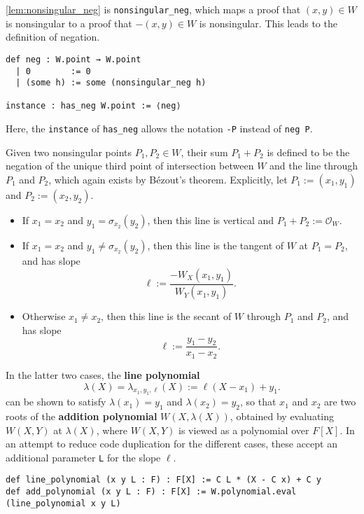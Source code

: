 \documentclass[a4paper,UKenglish,cleveref,autoref,thm-restate]{lipics-v2021}
\begin{document}
\pagebreak

\cref{lem:nonsingular_neg} is \texttt{nonsingular\_neg}, which maps a proof that $ (x, y) \in W $ is nonsingular to a proof that $ -(x, y) \in W $ is nonsingular. This leads to the definition of negation.
\begin{lstlisting}
def neg : W.point → W.point
  | 0        := 0
  | (some h) := some (nonsingular_neg h)

instance : has_neg W.point := ⟨neg⟩
\end{lstlisting}
Here, the \texttt{instance} of \texttt{has\_neg} allows the notation \texttt{-P} instead of \texttt{neg P}.

Given two nonsingular points $ P_1, P_2 \in W $, their sum $ P_1 + P_2 $ is defined to be the negation of the unique third point of intersection between $ W $ and the line through $ P_1 $ and $ P_2 $, which again exists by B\'ezout's theorem. Explicitly, let $ P_1 := (x_1, y_1) $ and $ P_2 := (x_2, y_2) $.
\begin{itemize}
\item If $ x_1 = x_2 $ and $ y_1 = \sigma_{x_2}(y_2) $, then this line is vertical and $ P_1 + P_2 := \mathcal{O}_W $.
\item If $ x_1 = x_2 $ and $ y_1 \ne \sigma_{x_2}(y_2) $, then this line is the tangent of $ W $ at $ P_1 = P_2 $, and has slope
\[ \ell := \dfrac{-W_X(x_1, y_1)}{W_Y(x_1, y_1)}. \]
\item Otherwise $ x_1 \ne x_2 $, then this line is the secant of $ W $ through $ P_1 $ and $ P_2 $, and has slope
\[ \ell := \dfrac{y_1 - y_2}{x_1 - x_2}. \]
\end{itemize}
In the latter two cases, the \textbf{line polynomial}
\[ \lambda(X) = \lambda_{x_1, y_1, \ell}(X) := \ell(X - x_1) + y_1. \]
can be shown to satisfy $ \lambda(x_1) = y_1 $ and $ \lambda(x_2) = y_2 $, so that $ x_1 $ and $ x_2 $ are two roots of the \textbf{addition polynomial} $ W(X, \lambda(X)) $, obtained by evaluating $ W(X, Y) $ at $ \lambda(X) $, where $ W(X, Y) $ is viewed as a polynomial over $ F[X] $. In an attempt to reduce code duplication for the different cases, these accept an additional parameter \texttt{L} for the slope $ \ell $.
\begin{lstlisting}
def line_polynomial (x y L : F) : F[X] := C L * (X - C x) + C y
def add_polynomial (x y L : F) : F[X] := W.polynomial.eval (line_polynomial x y L)
\end{lstlisting}
\end{document}
